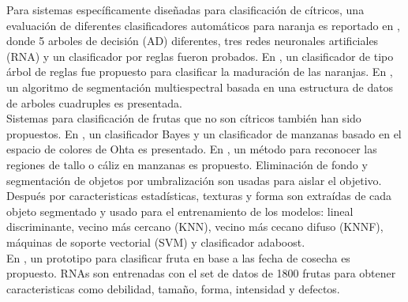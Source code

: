\documentclass[twoside,spanish,ESP,MSc]{plantillaLabUPV}
\theoremstyle{definition}
\begin{document}
Para sistemas específicamente diseñadas para clasificación de cítricos, una evaluación de diferentes clasificadores automáticos para naranja es reportado en \cite{analis}, donde 5 arboles de decisión (AD) diferentes, tres redes neuronales artificiales (RNA) y un clasificador por reglas fueron probados. En \cite{sirisath}, un clasificador de tipo árbol de reglas fue propuesto para clasificar la maduración de las naranjas. En \cite{Martinez-Uso:2005:MIS:1565835.1565847}, un algoritmo de segmentación multiespectral basada en una estructura de datos de arboles cuadruples es presentada. \\

Sistemas para clasificación de frutas que no son cítricos también han sido propuestos. En \cite{feng}, un clasificador Bayes y un clasificador de manzanas basado en el espacio de colores de Ohta es presentado. En \cite{UNAY2007597}, un método para reconocer las regiones de tallo o cáliz en manzanas es propuesto. Eliminación de fondo y segmentación de objetos por umbralización son usadas para aislar el objetivo. Después por caracteristicas estadísticas, texturas y forma son extraídas de cada objeto segmentado y usado para el entrenamiento de los modelos: lineal discriminante, vecino más cercano (KNN), vecino más cecano difuso (KNNF), máquinas de soporte vectorial (SVM) y clasificador adaboost.\\

En \cite{ALOHALI201129}, un prototipo para clasificar fruta en base a las fecha de cosecha es propuesto. RNAs son entrenadas con el set de datos de 1800 frutas para obtener caracteristicas como debilidad, tamaño, forma, intensidad y defectos.\\
\end{document}
